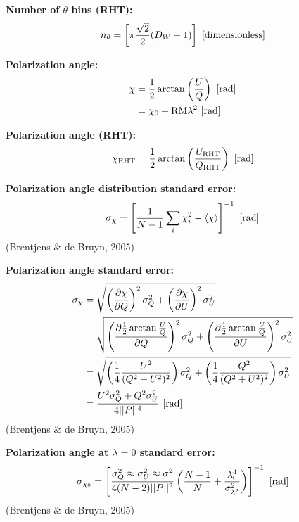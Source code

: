 \documentclass[a4paper,10pt]{article}
\begin{document}
{\noindent}\textbf{Number of $\theta$ bins (RHT):}
\begin{align*}
    n_\theta = \left[\pi\frac{\sqrt{2}}{2}(D_W-1)\right] ~ [{\rm dimensionless}]
\end{align*}

{\noindent}\textbf{Polarization angle:}
\begin{align*}
\chi &= \dfrac{1}{2}\arctan\left(\dfrac{U}{Q}\right) ~ [{\rm rad}] \\
&= \chi_0 + \mathrm{RM}\lambda^2 ~ [{\rm rad}]
\end{align*}

{\noindent}\textbf{Polarization angle (RHT):}
\begin{align*}
\chi_\mathrm{RHT} = \dfrac{1}{2}\arctan\left(\dfrac{U_\mathrm{RHT}}{Q_\mathrm{RHT}}\right) ~ [{\rm rad}]
\end{align*}

{\noindent}\textbf{Polarization angle distribution standard error:} 
\begin{align*}
\sigma_\chi = \left[ \dfrac{1}{N-1} \sum_i\chi_i^2 - \langle\chi\rangle \right]^{-1} ~ [{\rm rad}]
\end{align*}
(Brentjens \& de Bruyn, 2005)

{\noindent}\textbf{Polarization angle standard error:}
\begin{align*}
\sigma_\chi &= \sqrt{ \left(\dfrac{\partial\chi}{\partial Q}\right)^2\sigma_Q^2 + \left(\dfrac{\partial\chi}{\partial U}\right)^2\sigma_U^2 }\\
&= \sqrt{ \left(\dfrac{\partial\frac{1}{2}\arctan\frac{U}{Q}}{\partial Q}\right)^2\sigma_Q^2 + \left(\dfrac{\partial\frac{1}{2}\arctan\frac{U}{Q}}{\partial U}\right)^2\sigma_U^2 } \\
&= \sqrt{ \left(\dfrac{1}{4}\dfrac{U^2}{(Q^2+U^2)^2}\right)\sigma_Q^2 + \left(\dfrac{1}{4}\dfrac{Q^2}{(Q^2+U^2)^2}\right)\sigma_U^2 } \\
&= \dfrac{U^2\sigma_Q^2 + Q^2\sigma_U^2}{4\lvert\lvert P \rvert\rvert^4} ~ [{\rm rad}]
\end{align*}
(Brentjens \& de Bruyn, 2005)

{\noindent}\textbf{Polarization angle at $\lambda=0$ standard error:} 
\begin{align*}
\sigma_{\chi_0} = \left[ \dfrac{\sigma_Q^2\approx\sigma_U^2\approx\sigma^2}{4(N-2)\lvert\lvert P \rvert\rvert^2} \left( \dfrac{N-1}{N} + \dfrac{\lambda_0^4}{\sigma_{\lambda^2}^2} \right) \right]^{-1} ~ [{\rm rad}]
\end{align*}
(Brentjens \& de Bruyn, 2005)
\end{document}
